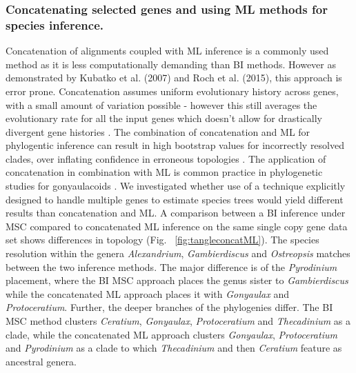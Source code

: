 \documentclass[12pt]{article}
\begin{document}
\subsubsection{Concatenating selected genes and using ML methods for species inference.}
\FloatBarrier
Concatenation of alignments coupled with ML inference is a commonly used method as it is less computationally demanding than BI methods. 
However as demonstrated by Kubatko et al. (2007) and Roch et al. (2015), this approach is error prone. 
Concatenation assumes uniform evolutionary history across genes, with a small amount of variation possible - however this still averages the evolutionary rate for all the input genes which doesn't allow for drastically divergent gene histories \cite{roch2015likelihood}. 
The combination of concatenation and ML for phylogentic inference can result in high bootstrap values for incorrectly resolved clades, over inflating confidence in erroneous topologies \cite{degnan2009gene}. 
The application of concatenation in combination with ML is common practice in phylogenetic studies for gonyaulacoids  \cite{shalchian2006combined,zhang2007three,saldarriaga2004molecular,murray2005improving,hoppenrath2010dinoflagellate}.
We investigated whether use of a technique explicitly designed to handle multiple genes to estimate species trees would yield different results than concatenation and ML. 
A comparison between a BI inference under MSC compared to concatenated ML inference on the same single copy gene data set shows differences in topology (Fig. ~\ref{fig:tangleconcatML}). 
The species resolution within the genera \emph{Alexandrium}, \emph{Gambierdiscus} and \emph{Ostreopsis} matches between the two inference methods. 
The major difference is of the \emph{Pyrodinium} placement, where the BI MSC approach places the genus sister to \emph{Gambierdiscus} while the concatenated ML approach places it with \emph{Gonyaulax} and \emph{Protoceratium}. 
Further, the deeper branches of the phylogenies differ. 
The BI MSC method clusters \emph{Ceratium}, \emph{Gonyaulax}, \emph{Protoceratium} and \emph{Thecadinium} as a clade, while the concatenated ML approach clusters \emph{Gonyaulax}, \emph{Protoceratium} and \emph{Pyrodinium} as a clade to which \emph{Thecadinium} and then \emph{Ceratium} feature as ancestral genera. 
\end{document}
